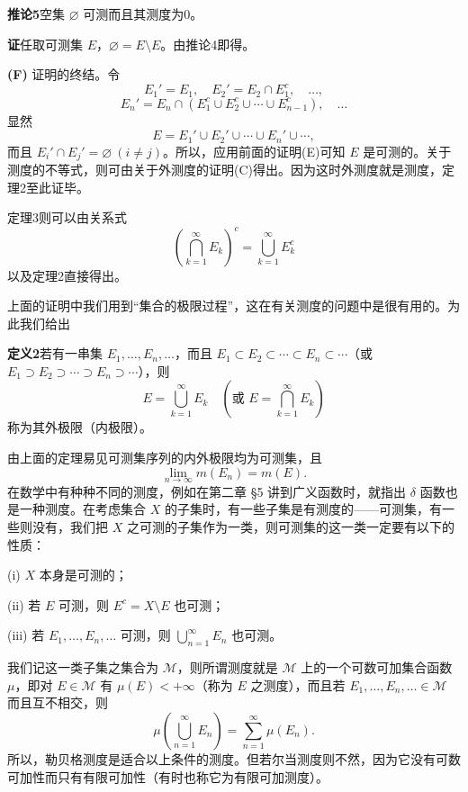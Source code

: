 \noindent\textbf{推论5}\quad 空集 $\varnothing$ 可测而且其测度为0。

\noindent\textbf{证}\quad 任取可测集 $E$，$\varnothing=E\setminus E$。由推论4即得。

\noindent\textbf{(F)} 证明的终结。令
\[
 E_1'=E_1,\quad E_2'=E_2\cap E_1^c,\quad\ldots,
\]
\[
 E_n'=E_n\cap(E_1^c\cup E_2^c\cup\cdots\cup E_{n-1}^c),\quad\ldots
\]
显然
\[
 E=E_1'\cup E_2'\cup\cdots\cup E_n'\cup\cdots,
\]
而且 $E_i'\cap E_j'=\varnothing\ (i\ne j)$。所以，应用前面的证明(E)可知 $E$ 是可测的。关于测度的不等式，则可由关于外测度的证明(C)得出。因为这时外测度就是测度，定理2至此证毕。

定理3则可以由关系式
\[
 \left(\bigcap_{k=1}^{\infty}E_k\right)^c=\bigcup_{k=1}^{\infty}E_k^c
\]
以及定理2直接得出。

上面的证明中我们用到“集合的极限过程”，这在有关测度的问题中是很有用的。为此我们给出

\noindent\textbf{定义2}\quad 若有一串集 $E_1,\ldots,E_n,\ldots$，而且 $E_1\subset E_2\subset\cdots\subset E_n\subset\cdots$（或 $E_1\supset E_2\supset\cdots\supset E_n\supset\cdots$），则
\[
 E=\bigcup_{k=1}^{\infty}E_k\quad\left(\text{或 }E=\bigcap_{k=1}^{\infty}E_k\right)
\]
称为其外极限（内极限）。

由上面的定理易见可测集序列的内外极限均为可测集，且
\begin{equation}
 \lim_{n\to\infty}m(E_n)=m(E).
 \tag{15}
\end{equation}
在数学中有种种不同的测度，例如在第二章 §5 讲到广义函数时，就指出 $\delta$ 函数也是一种测度。在考虑集合 $X$ 的子集时，有一些子集是有测度的——可测集，有一些则没有，我们把 $X$ 之可测的子集作为一类，则可测集的这一类一定要有以下的性质：

(i) $X$ 本身是可测的；

(ii) 若 $E$ 可测，则 $E^c=X\setminus E$ 也可测；

(iii) 若 $E_1,\ldots,E_n,\ldots$ 可测，则 $\bigcup_{n=1}^{\infty}E_n$ 也可测。

我们记这一类子集之集合为 $\mathcal M$，则所谓测度就是 $\mathcal M$ 上的一个可数可加集合函数 $\mu$，即对 $E\in\mathcal M$ 有 $\mu(E)<+\infty$（称为 $E$ 之测度），而且若 $E_1,\ldots,E_n,\ldots\in\mathcal M$ 而且互不相交，则
\begin{equation}
 \mu\left(\bigcup_{n=1}^{\infty}E_n\right)=\sum_{n=1}^{\infty}\mu(E_n).
 \tag{16}
\end{equation}
所以，勒贝格测度是适合以上条件的测度。但若尔当测度则不然，因为它没有可数可加性而只有有限可加性（有时也称它为有限可加测度）。

